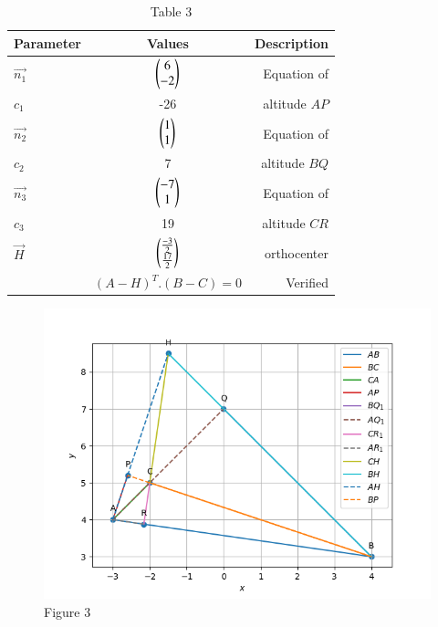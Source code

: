 \documentclass[journal,12pt,twocolumn]{IEEEtran}
\theoremstyle{remark}
\begin{document}
\begin{table}[h!]
 \begin{center}
  \caption{Table 3}
  \label{tab: table3}
\begin{tabular}{|l|c|r|}
     \hline
    Parameter & Values & Description\\
     \hline
     $\vec{n_1}$ & $\begin{pmatrix}6\\-2\\\end{pmatrix}$ & Equation of\\
     ${c_1}$ & -26 & altitude $AP$\\
     $\vec{n_2}$ & $\begin{pmatrix}1\\1\\\end{pmatrix}$ & Equation of\\
     ${c_2}$ & 7 & altitude $BQ$\\
     $\vec{n_3}$ & $\begin{pmatrix}-7\\1\\\end{pmatrix}$ & Equation of\\
     ${c_3}$ & 19 & altitude $CR$\\
     \hline
     $\vec H$ & $\begin{pmatrix}\frac{-3}{2}\\\frac{17}{2}\\\end{pmatrix}$ & orthocenter\\
     \hline
     {} & $(A-H)^T.(B-C)=0$ & Verified\\
     \hline
\end{tabular}
\end{center}
\end{table}
\begin{figure}[h!]
\centering

\includegraphics[width=\columnwidth] {./figs/fig19.png}
\caption{Figure 3}
\label{fig: $AP$}

\end{figure}
\end{document}
